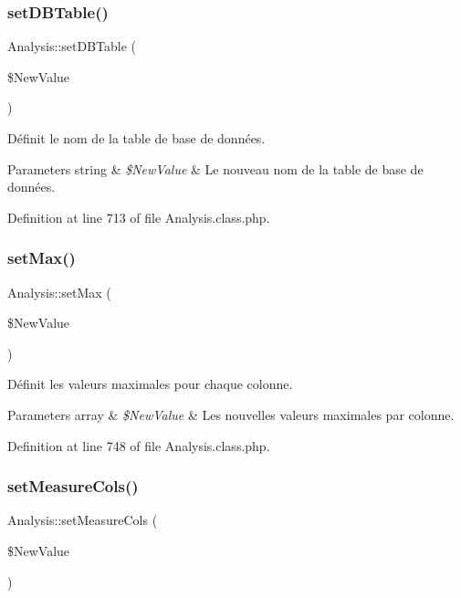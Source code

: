 \subsubsection{\texorpdfstring{set\+D\+B\+Table()}{setDBTable()}\hspace{0.1cm}{\footnotesize\ttfamily [2/2]}}
{\footnotesize\ttfamily Analysis\+::set\+D\+B\+Table (\begin{DoxyParamCaption}\item[{}]{\$\+New\+Value }\end{DoxyParamCaption})}

Définit le nom de la table de base de données.


\begin{DoxyParams}[1]{Parameters}
string & {\em \$\+New\+Value} & Le nouveau nom de la table de base de données. \\
\hline
\end{DoxyParams}


Definition at line 713 of file Analysis.\+class.\+php.

\mbox{\label{class_analysis_a0976a610f18b52541a363262e98956a7}} 
\subsubsection{\texorpdfstring{set\+Max()}{setMax()}}
{\footnotesize\ttfamily Analysis\+::set\+Max (\begin{DoxyParamCaption}\item[{}]{\$\+New\+Value }\end{DoxyParamCaption})}

Définit les valeurs maximales pour chaque colonne.


\begin{DoxyParams}[1]{Parameters}
array & {\em \$\+New\+Value} & Les nouvelles valeurs maximales par colonne. \\
\hline
\end{DoxyParams}


Definition at line 748 of file Analysis.\+class.\+php.

\mbox{\label{class_analysis_ab4f8d5dc30e551e9687dc5021b824f45}} 
\subsubsection{\texorpdfstring{set\+Measure\+Cols()}{setMeasureCols()}\hspace{0.1cm}{\footnotesize\ttfamily [1/2]}}
{\footnotesize\ttfamily Analysis\+::set\+Measure\+Cols (\begin{DoxyParamCaption}\item[{}]{\$\+New\+Value }\end{DoxyParamCaption})}



